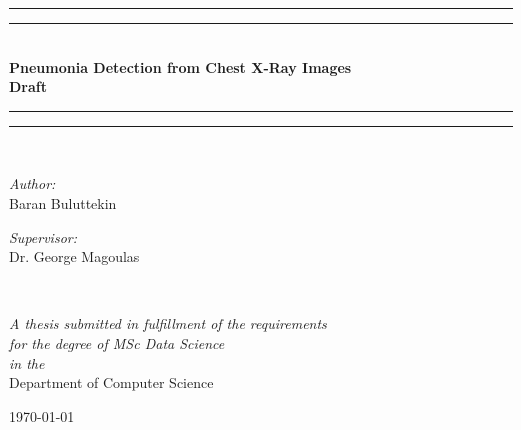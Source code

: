 \documentclass[12pt, twoside, a4paper]{article}
\begin{document}
\begin{titlepage}
    \begin{center}
        \vspace*{.06\textheight}{\scshape\LARGE Birkbeck, University of London\par}\vspace{1.5cm} %
        \rule[0.5ex]{\linewidth}{2pt}\vspace*{-\baselineskip}\vspace*{3.2pt}
        \rule[0.5ex]{\linewidth}{1pt}\\[\baselineskip]
        \huge{\bfseries Pneumonia Detection from Chest X-Ray Images\\ Draft}\\[4mm]
        \rule[0.5ex]{\linewidth}{1pt}\vspace*{-\baselineskip}\vspace{3.2pt}
        \rule[0.5ex]{\linewidth}{2pt}\\
        [1.5cm]


        \begin{minipage}[t]{0.4\textwidth}
        \begin{flushleft} \large
        \emph{Author:}\\
        {Baran Buluttekin} %
        \end{flushleft}
        \end{minipage}
        \begin{minipage}[t]{0.4\textwidth}
        \begin{flushright} \large
        \emph{Supervisor:} \\
        {Dr. George Magoulas} %
        \end{flushright}
        \end{minipage}\\
        [3cm]

            \vfill

            \large \textit{A thesis submitted in fulfillment of the requirements\\ for the degree of MSc Data Science}\\[0.3cm] %
            \textit{in the}\\[0.4cm]
            Department of Computer Science\\[2cm] %
 
            \vfill

            {\large \today}\\[4cm] %
 
            \vfill
    \end{center}
\end{titlepage}    
\thispagestyle{empty}
\cleardoublepage
\end{document}
